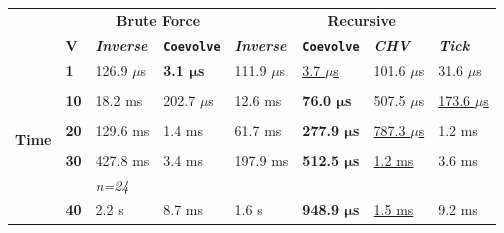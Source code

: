 \documentclass{juliacon}
\numberwithin{equation}{section}
\begin{document}
\begin{table}
\centering
\begin{tabular}{clllllll}
\toprule
\multicolumn{1}{l}{} &  & \multicolumn{2}{c}{\textbf{Brute Force }} & \multicolumn{4}{c}{\textbf{Recursive}} \\
\multicolumn{1}{l}{} & \textbf{V} & \textbf{\textit{Inverse}} & \textbf{\texttt{Coevolve}} & \textbf{\textit{Inverse}} & \textbf{\texttt{Coevolve}} & \textbf{\textit{CHV}} & \textbf{\textit{Tick}} \\
\hline
\multirow{20}{*}{\textbf{Time}} & \textbf{1}  & 126.9 \( \mu \)s  & \textbf{3.1 \( \bm{\mu} \)s} & 111.9 \( \mu \)s & \underline{3.7 \( \mu \)s}     & 101.6 \( \mu \)s             & 31.6 \( \mu \)s              \\
                                &             &                   &                              &                  &                                &                              &                              \\
                                & \textbf{10} & 18.2 ms           & 202.7 \( \mu \)s             & 12.6 ms          & \textbf{76.0 \( \bm{\mu} \)s}  & 507.5 \( \mu \)s             & \underline{173.6 \( \mu \)s} \\
                                &             &                   &                              &                  &                                &                              &                              \\
                                & \textbf{20} & 129.6 ms          & 1.4 ms                       & 61.7 ms          & \textbf{277.9 \( \bm{\mu} \)s} & \underline{787.3 \( \mu \)s} & 1.2 ms                       \\
                                &             &                   &                              &                  &                                &                              &                              \\
                                & \textbf{30} & 427.8 ms          & 3.4 ms                       & 197.9 ms         & \textbf{512.5 \( \bm{\mu} \)s} & \underline{1.2 ms}           & 3.6 ms                       \\
                                &             & \textit{n=24}     &                              &                  &                                &                              &                              \\
                                & \textbf{40} & 2.2 s             & 8.7 ms                       & 1.6 s            & \textbf{948.9 \( \bm{\mu} \)s} & \underline{1.5 ms}           & 9.2 ms                       \\

\end{tabular}
\end{table}
\end{document}
